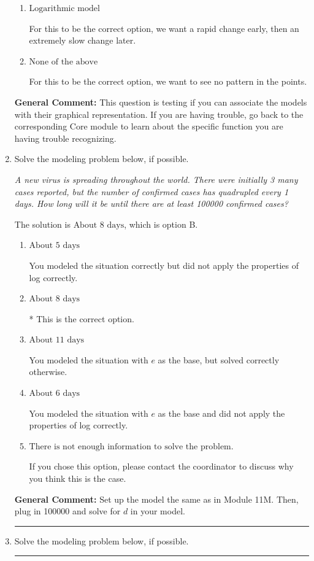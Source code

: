 \documentclass{extbook}[14pt]
\newcommand{\litem}[1]{\item #1

\rule{\textwidth}{0.4pt}}
\begin{document}
\begin{enumerate}
{\begin{enumerate}[label=\Alph*.]
For this to be the correct option, we want an extremely slow change early, then a rapid change later.
\item \( \text{Logarithmic model} \)

For this to be the correct option, we want a rapid change early, then an extremely slow change later.
\item \( \text{None of the above} \)

For this to be the correct option, we want to see no pattern in the points.
\end{enumerate}

\textbf{General Comment:} This question is testing if you can associate the models with their graphical representation. If you are having trouble, go back to the corresponding Core module to learn about the specific function you are having trouble recognizing.
}
\litem{
Solve the modeling problem below, if possible.

\begin{center}
    \textit{ A new virus is spreading throughout the world. There were initially 3 many cases reported, but the number of confirmed cases has quadrupled every 1 days. How long will it be until there are at least 100000 confirmed cases? }
\end{center}
The solution is \( \text{About } 8 \text{ days} \), which is option B.\begin{enumerate}[label=\Alph*.]
\item \( \text{About } 5 \text{ days} \)

You modeled the situation correctly but did not apply the properties of log correctly.
\item \( \text{About } 8 \text{ days} \)

* This is the correct option.
\item \( \text{About } 11 \text{ days} \)

You modeled the situation with $e$ as the base, but solved correctly otherwise.
\item \( \text{About } 6 \text{ days} \)

You modeled the situation with $e$ as the base and did not apply the properties of log correctly.
\item \( \text{There is not enough information to solve the problem.} \)

If you chose this option, please contact the coordinator to discuss why you think this is the case.
\end{enumerate}

\textbf{General Comment:} Set up the model the same as in Module 11M. Then, plug in 100000 and solve for $d$ in your model.
}
\litem{
Solve the modeling problem below, if possible.

}
\end{enumerate}
\end{document}
